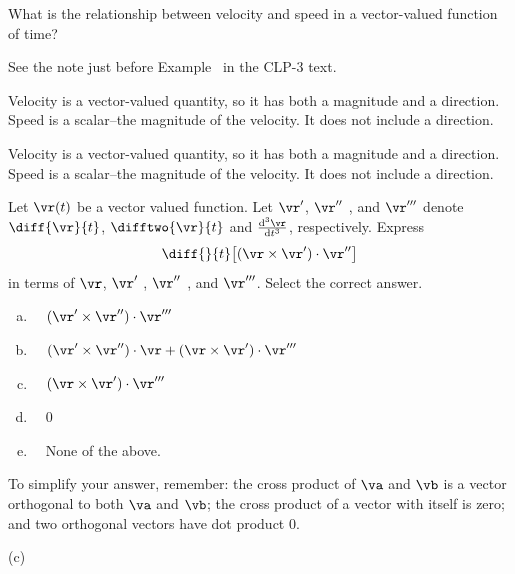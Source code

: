 \begin{question}
What is the relationship between velocity and speed in a vector-valued function of time?
\end{question}
\begin{hint} See the note just before Example~
in the CLP-3 text.
\end{hint}
\begin{answer}
Velocity is a vector-valued quantity, so it has both a magnitude and a direction. Speed is a scalar--the magnitude of the velocity. It does not include a direction.
\end{answer}
\begin{solution}
Velocity is a vector-valued quantity, so it has both a magnitude and a direction. Speed is a scalar--the magnitude of the velocity. It does not include a direction.\end{solution}

\begin{question}[M317 2005D] %
Let $\vr(t)$ be a vector valued function. Let $\vr'$, $\vr''$ , and $\vr'''$ 
denote $\diff{\vr}{t}$, $\difftwo{\vr}{t}$ and 
$\frac{\mathrm{d^3}\hfil\vr\hfil}{\mathrm{d}{t}^3}$, respectively.
Express
\begin{equation*}
\diff{\hfill}{t}\big[ (\vr \times \vr')\cdot\vr'' \big]
\end{equation*}
in terms of $\vr$, $\vr'$ , $\vr''$ , and $\vr'''$. 
Select the correct answer.
\begin{enumerate}[(a)]
\item\ \  $(\vr'\times\vr'' )\cdot\vr'''$
\item\ \  $(\vr'\times\vr'' )\cdot\vr + (\vr\times\vr' )\cdot\vr'''$
\item\ \  $(\vr\times\vr' )\cdot\vr'''$
\item\ \  $0$
\item\ \  None of the above.
\end{enumerate}
\end{question}

\begin{hint} 
To simplify your answer, remember: the cross product of $\va$ and $\vb$ is a vector orthogonal to both $\va$ and $\vb$; the cross product of a vector with itself is zero; and two orthogonal vectors have dot product 0.
\end{hint}

\begin{answer} 
(c)
\end{answer}

